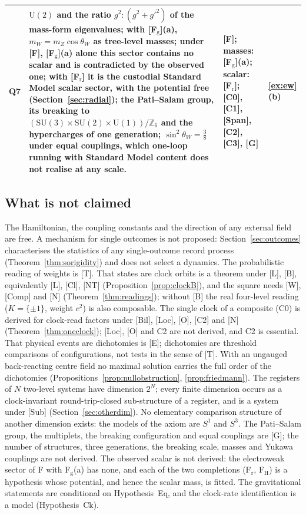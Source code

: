 \documentclass[aps,pra,onecolumn,superscriptaddress,nofootinbib,10pt]{revtex4-2}
\theoremstyle{definition}
\theoremstyle{remark}
\newcommand{\Z}{\mathbb{Z}}
\newcommand{\SU}{\mathrm{SU}}
\newcommand{\U}{\mathrm{U}}
\begin{document}
\begin{table}[h]
\begin{tabular}{@{}p{}p{}p{}p{}@{}}
Q7 & $\U(2)$ and the ratio $g^2:(g^2+g'^2)$ of the mass-form eigenvalues; with [F$_{\mathrm g}$](a), $m_W=m_Z\cos\theta_W$ as tree-level masses; under [F], [F$_{\mathrm g}$](a) alone this sector contains no scalar and is contradicted by the observed one; with [F$_{\mathrm r}$] it is the custodial Standard Model scalar sector, with the potential free (Section~\ref{sec:radial}); the Pati--Salam group, its breaking to $(\SU(3)\times\SU(2)\times\U(1))/\Z_6$ and the hypercharges of one generation; $\sin^2\theta_W=\tfrac38$ under equal couplings, which one-loop running with Standard Model content does not realise at any scale. & [F]; masses: [F$_{\mathrm g}$](a); scalar: [F$_{\mathrm r}$]; [C0], [C1], [Span], [C2], [C3], [G] & \ref{ex:ew}(b)\\
\bottomrule
\end{tabular}
\end{table}

\subsection{What is not claimed}
The Hamiltonian, the coupling constants and the direction of any external field are free.  A
mechanism for single outcomes is not proposed: Section~\ref{sec:outcomes} characterises the statistics of any
single-outcome record process (Theorem~\ref{thm:sorigidity}) and does not select a dynamics.  The probabilistic reading of weights is [T].  That
states are clock orbits is a theorem under [L], [B], equivalently [L], [Cl], [NT]
(Proposition~\ref{prop:clockB}), and the square needs [W], [Comp] and [N] (Theorem~\ref{thm:readings}); without [B] the
real four-level reading ($K=\{\pm1\}$, weight $c^2$) is also composable.  The single clock of a composite (C0) is derived for clock-read factors under [Bil], [Loc], [O], [C2] and
[N] (Theorem~\ref{thm:oneclock}); [Loc], [O] and C2 are not derived, and C2 is essential.  That physical
events are dichotomies is [E]; dichotomies are threshold comparisons of configurations, not tests in
the sense of [T].  With an ungauged back-reacting centre field no maximal solution carries the full order of the
dichotomies (Propositions~\ref{prop:nullobstruction}, \ref{prop:friedmann}).  The registers of $N$ two-level systems have dimension $2^N$; every finite dimension occurs as a
clock-invariant round-trip-closed sub-structure of a register, and is a system under [Sub]
(Section~\ref{sec:otherdim}).  No elementary comparison structure of another dimension exists: the models of
the axiom are $S^1$ and $S^3$.  The Pati--Salam group, the multiplets, the breaking
configuration and equal couplings are [G]; the number of structures, three generations, the
breaking scale, masses and Yukawa couplings are not derived.  The observed scalar is not derived: the
electroweak sector of F with F$_{\mathrm g}$(a) has none, and each of the two completions (F$_{\mathrm r}$, F$_{\mathrm H}$) is a hypothesis
whose potential, and hence the scalar mass, is fitted.  The gravitational statements are conditional on
Hypothesis~Eq, and the clock-rate identification is a model (Hypothesis~Ck).
\end{document}
